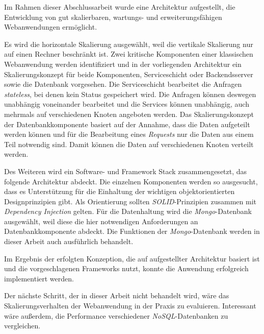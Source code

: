 
Im Rahmen dieser Abschlussarbeit wurde eine Architektur aufgestellt, die Entwicklung von gut skalierbaren, wartungs- und erweiterungsfähigen Webanwendungen ermöglicht.

Es wird die horizontale Skalierung ausgewählt, weil die vertikale Skalierung nur auf einen Rechner beschränkt ist. Zwei kritische Komponenten einer klassischen Webanwendung werden identifiziert und in der vorliegenden Architektur ein Skalierungskonzept für beide Komponenten, Serviceschicht oder Backendsserver sowie die Datenbank vorgesehen. Die Serviceschicht bearbeitet die Anfragen \textit{stateless}, bei denen kein Status gespeichert wird. Die Anfragen können deswegen unabhängig voneinander bearbeitet und die Services können unabhängig, auch mehrmals auf verschiedenen Knoten angeboten werden. Das Skalierungskonzept der Datenbankkomponente basiert auf der Annahme, dass die Daten aufgeteilt werden können und für die Bearbeitung eines \textit{Requests} nur die Daten aus einem Teil notwendig sind. Damit können die Daten auf verschiedenen Knoten verteilt werden.

Des Weiteren wird ein Software- und Framework Stack zusammengesetzt, das folgende Architektur abdeckt. Die einzelnen Komponenten werden so ausgesucht, dass es Unterstützung für die Einhaltung der wichtigen objektorientierten Designprinzipien gibt. Als Orientierung sollten \textit{SOLID}-Prinzipien zusammen mit \textit{Dependency Injection} gelten. Für die Datenhaltung wird die \textit{Mongo}-Datenbank ausgewählt, weil diese die hier notwendigen Anforderungen an Datenbankkomponente abdeckt. Die Funktionen der \textit{Mongo}-Datenbank werden in dieser Arbeit auch ausführlich behandelt. 

Im Ergebnis der erfolgten Konzeption, die auf aufgestellter Architektur basiert ist und die vorgeschlagenen Frameworks nutzt, konnte die Anwendung erfolgreich implementiert werden.

Der nächste Schritt, der in dieser Arbeit nicht behandelt wird, wäre das Skalierungsverhalten der Webanwendung in der Praxis zu evaluieren. Interessant wäre außerdem, die Performance verschiedener \textit{NoSQL}-Datenbanken zu vergleichen. 

